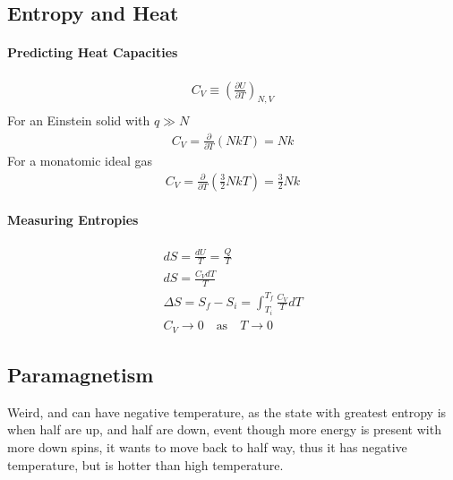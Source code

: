 \documentclass[12pt]{article}
\begin{document}
\subsection{Entropy and Heat}%
\label{sub:entropy_and_heat}

\paragraph{Predicting Heat Capacities}%
\label{par:predicting_heat_capacities}

\begin{align}
  C_V\equiv\left(\frac{\partial U}{\partial T}\right)_{N,V}\\
\end{align}
For an Einstein solid with $q \gg N$
\begin{align}
  C_V=\frac{\partial}{\partial T}\left(NkT\right)=Nk
\end{align}
For a monatomic ideal gas
\begin{align}
  C_V=\frac{\partial}{\partial T}\left(\frac{3}{2}NkT\right)=\frac{3}{2}Nk
\end{align}

\paragraph{Measuring Entropies}%
\label{par:measuring_entropies}

\begin{align}
  dS =\frac{dU}{T}=\frac{Q}{T}\\
  dS=\frac{C_VdT}{T}\\
  \Delta S=S_f-S_i=\int_{T_i}^{T_f}\frac{C_V}{T}dT\\
  C_V\rightarrow0\quad\text{as}\quad T\rightarrow0
\end{align}

\subsection{Paramagnetism}%
\label{sub:paramagnetism}

Weird, and can have negative temperature, as the state with greatest entropy is
when half are up, and half are down, event though more energy is present with
more down spins, it wants to move back to half way, thus it has negative
temperature, but is hotter than high temperature.
\end{document}
